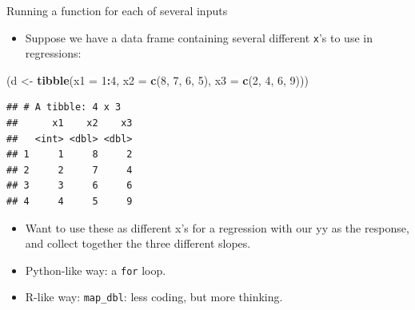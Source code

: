 \documentclass[
  ignorenonframetext,
]{beamer}
\newenvironment{Shaded}{\begin{snugshade}}{\end{snugshade}}
\newcommand{\DataTypeTok}[1]{\textcolor[rgb]{0.13,0.29,0.53}{#1}}
\newcommand{\DecValTok}[1]{\textcolor[rgb]{0.00,0.00,0.81}{#1}}
\newcommand{\KeywordTok}[1]{\textcolor[rgb]{0.13,0.29,0.53}{\textbf{#1}}}
\newcommand{\NormalTok}[1]{#1}
\newcommand{\OperatorTok}[1]{\textcolor[rgb]{0.81,0.36,0.00}{\textbf{#1}}}
\newcommand{\StringTok}[1]{\textcolor[rgb]{0.31,0.60,0.02}{#1}}
\providecommand{\tightlist}{%
  \setlength{\itemsep}{0pt}\setlength{\parskip}{0pt}}
\begin{document}
\begin{frame}[fragile]{Running a function for each of several inputs}
\protect\hypertarget{running-a-function-for-each-of-several-inputs}{}

\begin{itemize}
\tightlist
\item
  Suppose we have a data frame containing several different \texttt{x}'s
  to use in regressions:
\end{itemize}

\begin{Shaded}
\begin{Highlighting}[]
\NormalTok{(d <-}\StringTok{ }\KeywordTok{tibble}\NormalTok{(}\DataTypeTok{x1 =} \DecValTok{1}\OperatorTok{:}\DecValTok{4}\NormalTok{, }\DataTypeTok{x2 =} \KeywordTok{c}\NormalTok{(}\DecValTok{8}\NormalTok{, }\DecValTok{7}\NormalTok{, }\DecValTok{6}\NormalTok{, }\DecValTok{5}\NormalTok{), }\DataTypeTok{x3 =} \KeywordTok{c}\NormalTok{(}\DecValTok{2}\NormalTok{, }\DecValTok{4}\NormalTok{, }\DecValTok{6}\NormalTok{, }\DecValTok{9}\NormalTok{)))}
\end{Highlighting}
\end{Shaded}

\begin{verbatim}
## # A tibble: 4 x 3
##      x1    x2    x3
##   <int> <dbl> <dbl>
## 1     1     8     2
## 2     2     7     4
## 3     3     6     6
## 4     4     5     9
\end{verbatim}

\begin{itemize}
\tightlist
\item
  Want to use these as different x's for a regression with our yy as the
  response, and collect together the three different slopes.
\item
  Python-like way: a \texttt{for} loop.
\item
  R-like way: \texttt{map\_dbl}: less coding, but more thinking.
\end{itemize}

\end{frame}
\end{document}

